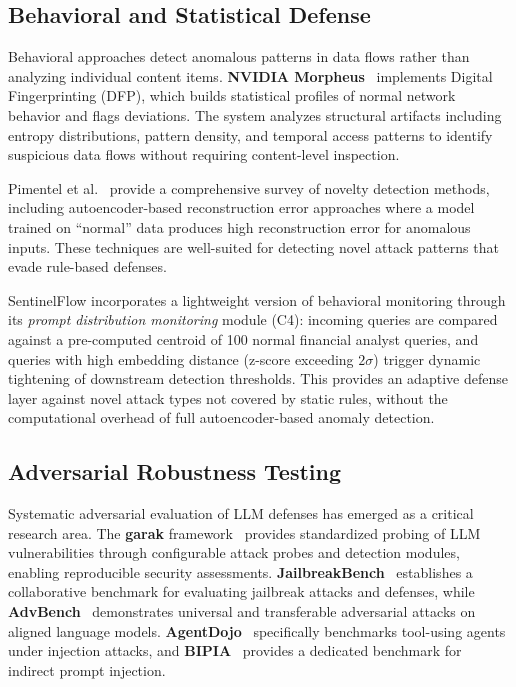 \documentclass[journal]{IEEEtran}
\begin{document}
\subsection{Behavioral and Statistical Defense}
\label{Sect:LR_Behavioral}

Behavioral approaches detect anomalous patterns in data flows rather than analyzing individual content items. \textbf{NVIDIA Morpheus}~\cite{nvidia_morpheus} implements Digital Fingerprinting (DFP), which builds statistical profiles of normal network behavior and flags deviations. The system analyzes structural artifacts including entropy distributions, pattern density, and temporal access patterns to identify suspicious data flows without requiring content-level inspection.

Pimentel et al.~\cite{pimentel_novelty} provide a comprehensive survey of novelty detection methods, including autoencoder-based reconstruction error approaches where a model trained on ``normal'' data produces high reconstruction error for anomalous inputs. These techniques are well-suited for detecting novel attack patterns that evade rule-based defenses.

SentinelFlow incorporates a lightweight version of behavioral monitoring through its \textit{prompt distribution monitoring} module (C4): incoming queries are compared against a pre-computed centroid of 100 normal financial analyst queries, and queries with high embedding distance (z-score exceeding $2\sigma$) trigger dynamic tightening of downstream detection thresholds. This provides an adaptive defense layer against novel attack types not covered by static rules, without the computational overhead of full autoencoder-based anomaly detection.

\subsection{Adversarial Robustness Testing}
\label{Sect:LR_Adversarial}

Systematic adversarial evaluation of LLM defenses has emerged as a critical research area. The \textbf{garak} framework~\cite{garak_paper, garak_github} provides standardized probing of LLM vulnerabilities through configurable attack probes and detection modules, enabling reproducible security assessments. \textbf{JailbreakBench}~\cite{jailbreakbench} establishes a collaborative benchmark for evaluating jailbreak attacks and defenses, while \textbf{AdvBench}~\cite{advbench} demonstrates universal and transferable adversarial attacks on aligned language models. \textbf{AgentDojo}~\cite{agentdojo} specifically benchmarks tool-using agents under injection attacks, and \textbf{BIPIA}~\cite{bipia} provides a dedicated benchmark for indirect prompt injection.
\end{document}
